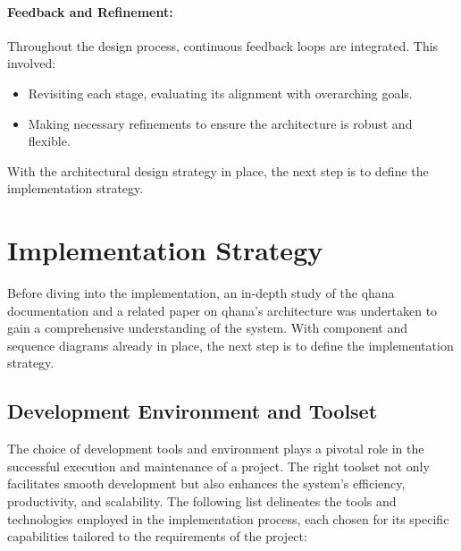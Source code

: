 \documentclass[
  a4paper,  %
  twoside,  %
  bibliography=totoc,
  headsepline,
  cleardoublepage=empty,
  parskip=half,
  draft=false
]{scrbook}
\begin{document}
\paragraph{Feedback and Refinement:}
Throughout the design process, continuous feedback loops are integrated. This involved:
\begin{itemize}
\item Revisiting each stage, evaluating its alignment with overarching goals.
\item Making necessary refinements to ensure the architecture is robust and flexible.
\end{itemize}

With the architectural design strategy in place, the next step is to define the implementation strategy.

\section{Implementation Strategy}
\label{sec:implementationStrategy}

Before diving into the implementation, an in-depth study of the \gls{qhana} documentation \cite{FabianBuehler} and a related paper on \gls{qhana}'s architecture \cite{Buehler2022} was undertaken to gain a comprehensive understanding of the system.
With component and sequence diagrams already in place, the next step is to define the implementation strategy.

\subsection{Development Environment and Toolset}

The choice of development tools and environment plays a pivotal role in the successful execution and maintenance of a project.
The right toolset not only facilitates smooth development but also enhances the system's efficiency, productivity, and scalability.
The following list delineates the tools and technologies employed in the implementation process, each chosen for its specific capabilities tailored to the requirements of the project:
\end{document}
